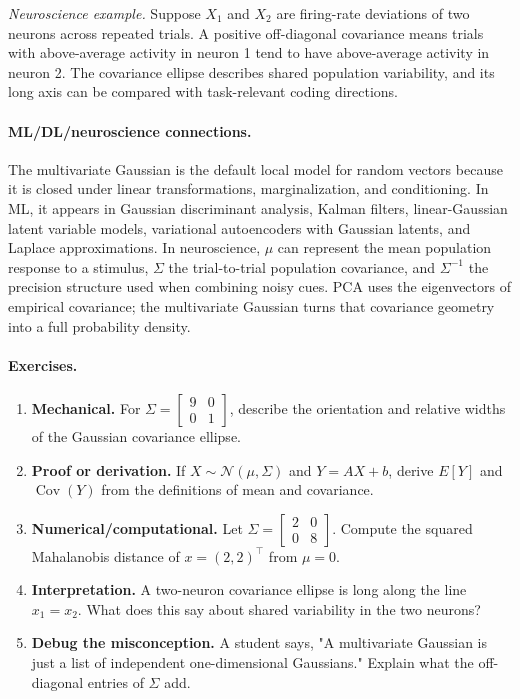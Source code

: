 \emph{Neuroscience example.} Suppose \(X_1\) and \(X_2\) are firing-rate deviations of two neurons across repeated trials. A positive off-diagonal covariance means trials with above-average activity in neuron 1 tend to have above-average activity in neuron 2. The covariance ellipse describes shared population variability, and its long axis can be compared with task-relevant coding directions.

\paragraph{ML/DL/neuroscience connections.}
The multivariate Gaussian is the default local model for random vectors because it is closed under linear transformations, marginalization, and conditioning. In ML, it appears in Gaussian discriminant analysis, Kalman filters, linear-Gaussian latent variable models, variational autoencoders with Gaussian latents, and Laplace approximations. In neuroscience, \(\mu\) can represent the mean population response to a stimulus, \(\Sigma\) the trial-to-trial population covariance, and \(\Sigma^{-1}\) the precision structure used when combining noisy cues. PCA uses the eigenvectors of empirical covariance; the multivariate Gaussian turns that covariance geometry into a full probability density.

\paragraph{Exercises.}
\begin{enumerate}[label=\textbf{14.3.\arabic*.}, leftmargin=*]
\item \textbf{Mechanical.} For \(\Sigma=\begin{bmatrix}9&0\\0&1\end{bmatrix}\), describe the orientation and relative widths of the Gaussian covariance ellipse.
\item \textbf{Proof or derivation.} If \(X\sim\mathcal N(\mu,\Sigma)\) and \(Y=AX+b\), derive \(E[Y]\) and \(\operatorname{Cov}(Y)\) from the definitions of mean and covariance.
\item \textbf{Numerical/computational.} Let \(\Sigma=\begin{bmatrix}2&0\\0&8\end{bmatrix}\). Compute the squared Mahalanobis distance of \(x=(2,2)^\top\) from \(\mu=0\).
\item \textbf{Interpretation.} A two-neuron covariance ellipse is long along the line \(x_1=x_2\). What does this say about shared variability in the two neurons?
\item \textbf{Debug the misconception.} A student says, "A multivariate Gaussian is just a list of independent one-dimensional Gaussians." Explain what the off-diagonal entries of \(\Sigma\) add.
\end{enumerate}


